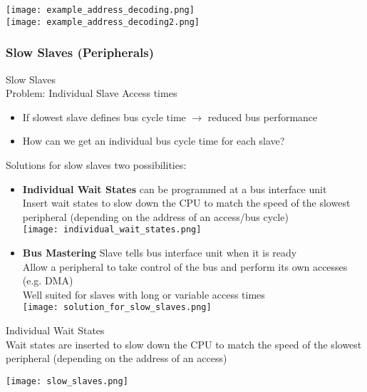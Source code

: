 \begin{example}
    \texttt{[image: example\_address\_decoding.png]}\\
    \texttt{[image: example\_address\_decoding2.png]}
\end{example}

\subsubsection{Slow Slaves (Peripherals)}

\begin{definition}{Slow Slaves}\\
    Problem: Individual Slave Access times
    \begin{itemize}
        \item If slowest slave defines bus cycle time $\rightarrow$ reduced bus performance
        \item How can we get an individual bus cycle time for each slave?
    \end{itemize}   
\end{definition}

\begin{concept}{Solutions for slow slaves} two possibilities:
    \begin{itemize}
        \item \textbf{Individual Wait States} can be programmed at a bus interface unit \\
        Insert wait states to slow down the CPU to match the speed of the slowest peripheral (depending on the address of an access/bus cycle)\\
        \texttt{[image: individual\_wait\_states.png]}
        \item \textbf{Bus Mastering} Slave tells bus interface unit when it is ready \\
        Allow a peripheral to take control of the bus and perform its own accesses (e.g. DMA)\\
        Well suited for slaves with long or variable access times\\
        \texttt{[image: solution\_for\_slow\_slaves.png]}
    \end{itemize}
\end{concept}

\begin{KR}{Individual Wait States}\\
    Wait states are inserted to slow down the CPU to match the speed of the slowest peripheral (depending on the address of an access)

    \texttt{[image: slow\_slaves.png]}    
\end{KR}



